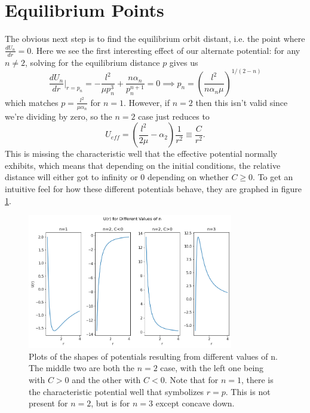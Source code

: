 \documentclass[letterpaper, reqno,11pt]{article}
\begin{document}
\section{Equilibrium Points}

The obvious next step is to find the equilibrium orbit distant, i.e. the point where $\frac{dU_n}{dr}=0$. Here we see the first interesting effect of our alternate potential: for any $n\neq 2$, solving for the equilibrium distance $p$ gives us
\[
\frac{dU_n}{dr}\bigg|_{r=p_n}=-\frac{l^2}{\mu p_n^3}+\frac{n\alpha_n}{p_n^{n+1}}=0\implies p_n=\left( \frac{l^2}{ n\alpha_n\mu} \right)^{1 /(2-n)}
\]
which matches $p=\frac{l^2}{\mu\alpha_n}$ for $n=1$. However, if $n=2$ then this isn't valid since we're dividing by zero, so the $n=2$ case just reduces to
\[
U_{eff}=\left( \frac{l^2}{2\mu}-\alpha_2 \right)\frac{1}{r^2}\equiv \frac{C}{r^2}
.\]
This is missing the characteristic well that the effective potential normally exhibits, which means that depending on the initial conditions, the relative distance will either got to infinity or $0$ depending on whether $C\geq 0$. To get an intuitive feel for how these different potentials behave, they are graphed in figure \ref{fig:U-plots}. 

\begin{figure}[htpb]
    \centering
    \includegraphics[width=0.8\textwidth]{U-plots}
    \caption{Plots of the shapes of potentials resulting from different values of n. The middle two are both the $n=2$ case, with the left one being with $C>0$ and the other with $C<0$. Note that for $n=1$, there is the characteristic potential well that symbolizes $r=p$. This is not present for $n=2$, but is for $n=3$ except concave down. }
    \label{fig:U-plots}
\end{figure}
\end{document}

